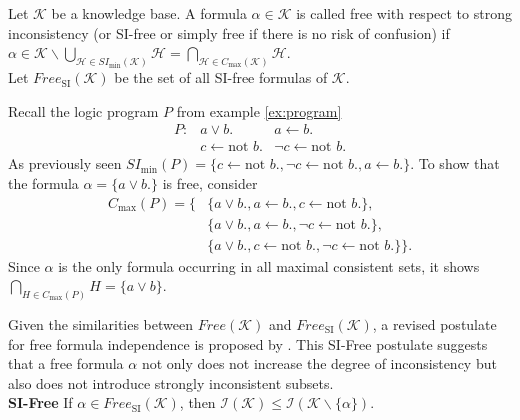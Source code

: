 \begin{definition}
    Let \(\mathcal{K}\) be a knowledge base. A formula \(\alpha \in \mathcal{K}\) is called free with respect to strong inconsistency (or SI-free or simply free if there is no risk of confusion) if\\
    \(\alpha \in \mathcal{K} \backslash \bigcup\limits_{\mathcal{H} \in SI_{\min}(\mathcal{K})} \mathcal{H} = \bigcap\limits_{\mathcal{H} \in C_{\max}(\mathcal{K})} \mathcal{H}\).\\
    Let \(Free_{\text{SI}}(\mathcal{K})\) be the set of all SI-free formulas of \(\mathcal{K}\).
\end{definition}

\begin{example}
    Recall the logic program \(P\) from example \ref{ex:program}
    \[\begin{array}{rrr}
            P: & a \lor b.                  & a \leftarrow b.                 \\
               & c \leftarrow \text{not }b. & \neg c \leftarrow \text{not }b.
        \end{array}\]
    As previously seen \(SI_{\min}(P) = \{c \leftarrow \text{not }b., \neg c \leftarrow \text{not }b., a \leftarrow b.\}\). To show that the formula \(\alpha = \{a \lor b.\}\) is free, consider
    \begin{align*}
        C_{\max}(P) = \{ & \{a \lor b., a \leftarrow b., c \leftarrow \text{not }b.\},                   \\
                         & \{a \lor b., a \leftarrow b., \neg c \leftarrow \text{not }b.\},              \\
                         & \{a \lor b., c \leftarrow \text{not }b., \neg c \leftarrow \text{not }b.\}\}.
    \end{align*}
    Since \(\alpha\) is the only formula occurring in all maximal consistent sets, it shows \(\bigcap_{H \in C_{\max}(P)} H = \{a \lor b\}\).
\end{example}

Given the similarities between \(Free(\mathcal{K})\) and \(Free_{\text{SI}}(\mathcal{K})\), a revised postulate for free formula independence is proposed by \cite{ulbricht_handling_2020}. This SI-Free postulate suggests that a free formula \(\alpha\) not only does not increase the degree of inconsistency but also does not introduce strongly inconsistent subsets.
\\
\textbf{SI-Free}
If \(\alpha \in Free_{\text{SI}}(\mathcal{K})\), then \(\mathcal{I}(\mathcal{K}) \leq \mathcal{I}(\mathcal{K} \backslash \{\alpha\})\).

